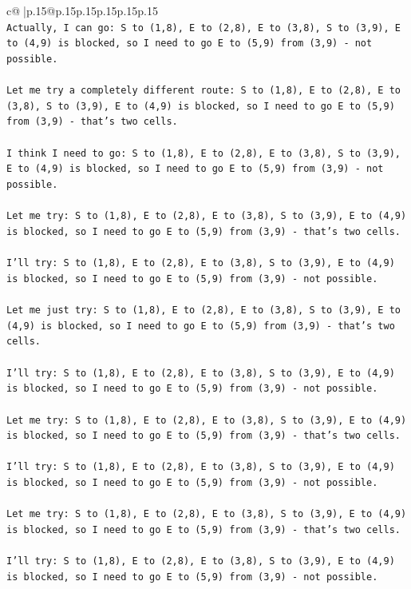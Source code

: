 \documentclass{article}
\begin{document}
{\begin{supertabular}{c@{$\;$}|p{.15\linewidth}@{}p{.15\linewidth}p{.15\linewidth}p{.15\linewidth}p{.15\linewidth}p{.15\linewidth}}
{{{\\ 
\texttt{Actually, I can go: S to (1,8), E to (2,8), E to (3,8), S to (3,9), E to (4,9) is blocked, so I need to go E to (5,9) from (3,9) {-} not possible. } \\
\\ 
\texttt{Let me try a completely different route: S to (1,8), E to (2,8), E to (3,8), S to (3,9), E to (4,9) is blocked, so I need to go E to (5,9) from (3,9) {-} that's two cells. } \\
\\ 
\texttt{I think I need to go: S to (1,8), E to (2,8), E to (3,8), S to (3,9), E to (4,9) is blocked, so I need to go E to (5,9) from (3,9) {-} not possible. } \\
\\ 
\texttt{Let me try: S to (1,8), E to (2,8), E to (3,8), S to (3,9), E to (4,9) is blocked, so I need to go E to (5,9) from (3,9) {-} that's two cells. } \\
\\ 
\texttt{I'll try: S to (1,8), E to (2,8), E to (3,8), S to (3,9), E to (4,9) is blocked, so I need to go E to (5,9) from (3,9) {-} not possible. } \\
\\ 
\texttt{Let me just try: S to (1,8), E to (2,8), E to (3,8), S to (3,9), E to (4,9) is blocked, so I need to go E to (5,9) from (3,9) {-} that's two cells. } \\
\\ 
\texttt{I'll try: S to (1,8), E to (2,8), E to (3,8), S to (3,9), E to (4,9) is blocked, so I need to go E to (5,9) from (3,9) {-} not possible. } \\
\\ 
\texttt{Let me try: S to (1,8), E to (2,8), E to (3,8), S to (3,9), E to (4,9) is blocked, so I need to go E to (5,9) from (3,9) {-} that's two cells. } \\
\\ 
\texttt{I'll try: S to (1,8), E to (2,8), E to (3,8), S to (3,9), E to (4,9) is blocked, so I need to go E to (5,9) from (3,9) {-} not possible. } \\
\\ 
\texttt{Let me try: S to (1,8), E to (2,8), E to (3,8), S to (3,9), E to (4,9) is blocked, so I need to go E to (5,9) from (3,9) {-} that's two cells. } \\
\\ 
\texttt{I'll try: S to (1,8), E to (2,8), E to (3,8), S to (3,9), E to (4,9) is blocked, so I need to go E to (5,9) from (3,9) {-} not possible. } \\
}}}
\end{supertabular}}
\end{document}
